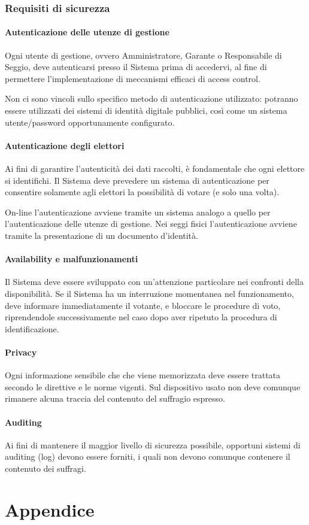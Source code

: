 \documentclass{report}
\begin{document}
\subsection{Requisiti di sicurezza}

\subsubsection{Autenticazione delle utenze di gestione}
Ogni utente di gestione, ovvero Amministratore, Garante o Responsabile di Seggio, deve autenticarsi presso il Sistema prima di accedervi, al fine di permettere l'implementazione di meccanismi efficaci di access control. 

Non ci sono vincoli sullo specifico metodo di autenticazione utilizzato: potranno essere utilizzati dei sistemi di identità digitale pubblici, così come un sistema utente/password opportunamente configurato.

\subsubsection{Autenticazione degli elettori}
Ai fini di garantire l'autenticità dei dati raccolti, è fondamentale che ogni elettore si identifichi. Il Sistema deve prevedere un sistema di autenticazione per consentire solamente agli elettori la possibilità di votare (e solo una volta).

On-line l'autenticazione avviene tramite un sistema analogo a quello per l'autenticazione delle utenze di gestione. Nei seggi fisici l'autenticazione avviene tramite la presentazione di un documento d'identità.

\subsubsection{Availability e malfunzionamenti}
Il Sistema deve essere sviluppato con un'attenzione particolare nei confronti della disponibilità. Se il Sistema ha un interruzione momentanea nel funzionamento, deve informare immediatamente il votante, e bloccare le procedure di voto, riprendendole successivamente nel caso dopo aver ripetuto la procedura di identificazione.

\subsubsection{Privacy}
Ogni informazione sensibile che che viene memorizzata deve essere trattata secondo le direttive e le norme vigenti. Sul dispositivo usato non deve comunque rimanere alcuna traccia del contenuto del suffragio espresso.

\subsubsection{Auditing}
Ai fini di mantenere il maggior livello di sicurezza possibile, opportuni sistemi di auditing (log) devono essere forniti, i quali non devono comunque contenere il contenuto dei suffragi.






\chapter{Appendice}
\end{document}

